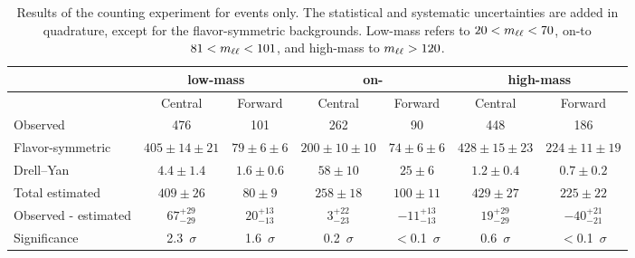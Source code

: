 
\begin{table}[hbtp]
 \renewcommand{\arraystretch}{1.3}
 \setlength{\belowcaptionskip}{6pt}
 \scriptsize
 \centering
 \caption{Results of the counting experiment for \MM events only.
     The statistical and systematic uncertainties are added in quadrature, except for the flavor-symmetric backgrounds.
     Low-mass refers to $20 < m_{\ell\ell} < 70$\GeV, on-\Z to  $81 < m_{\ell\ell} < 101$\GeV, and high-mass to $m_{\ell\ell} > 120$\GeV.
     }
  \label{tab:METresults2012MM}
  \begin{tabular}{l| cc | cc | cc}

    							& \multicolumn{2}{c}{low-mass} & \multicolumn{2}{c}{on-\Z} & \multicolumn{2}{c}{high-mass} \\ 

    \hline
                                &  Central        & Forward  &  Central  & Forward   &  Central        & Forward \\ 

    \hline
        Observed       &  476                   & 101              &  262            &  90       &   448           &   186    \\

    \hline
        Flavor-symmetric    & $405\pm14\pm21$        & $79\pm6\pm6$  &  $200\pm10\pm10$ & $74\pm6\pm6$ & $428\pm15\pm23$ & $224\pm11\pm19$ \\

            Drell--Yan          & $4.4\pm1.4$            & $1.6\pm0.6$      & $58\pm10$ & $25\pm6$ & $1.2\pm0.4$ & $0.7\pm0.2$ \\

    \hline
            Total estimated          & $409\pm26$            & $80\pm9$      & $258\pm18$ & $100\pm11$ & $429\pm27$ & $225\pm22$ \\

    \hline
         Observed - estimated  & $67^{+29}_{-29}$      & $20^{+13}_{-13}$ & $3^{+22}_{-23} $ & $-11^{+13}_{-13}$ & $19^{+29}_{-29}$ & $-40^{+21}_{-21} $ \\ 

    \hline
   Significance      & 2.3~$\sigma$    &  1.6~$\sigma$  & 0.2~$\sigma$ & $<$0.1~$\sigma$ & 0.6~$\sigma$ & $<$0.1~$\sigma$ \\ 


  \end{tabular}
\end{table}


